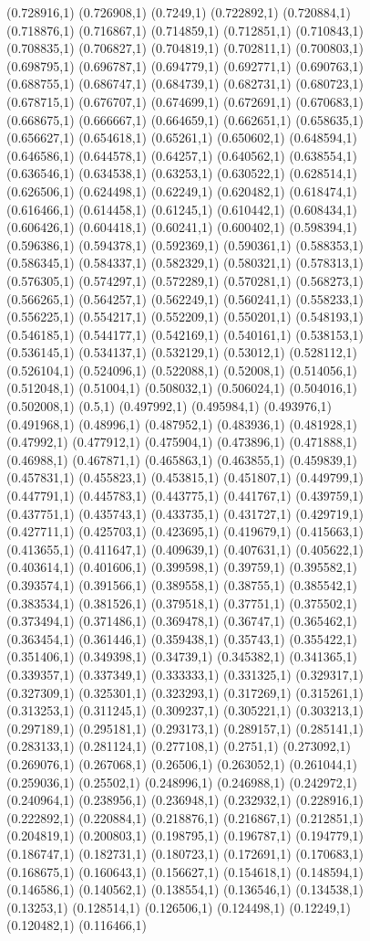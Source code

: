 \documentclass[conference]{IEEEtran}
\begin{document}
\begin{figure}[t]
(0.728916,1) (0.726908,1) (0.7249,1) (0.722892,1) (0.720884,1) (0.718876,1) (0.716867,1) (0.714859,1) (0.712851,1) (0.710843,1) (0.708835,1) (0.706827,1) (0.704819,1) (0.702811,1) (0.700803,1) (0.698795,1) (0.696787,1) (0.694779,1) (0.692771,1) (0.690763,1) (0.688755,1) (0.686747,1) (0.684739,1) (0.682731,1) (0.680723,1) (0.678715,1) (0.676707,1) (0.674699,1) (0.672691,1) (0.670683,1) (0.668675,1) (0.666667,1) (0.664659,1) (0.662651,1) (0.658635,1) (0.656627,1) (0.654618,1) (0.65261,1) (0.650602,1) (0.648594,1) (0.646586,1) (0.644578,1) (0.64257,1) (0.640562,1) (0.638554,1) (0.636546,1) (0.634538,1) (0.63253,1) (0.630522,1) (0.628514,1) (0.626506,1) (0.624498,1) (0.62249,1) (0.620482,1) (0.618474,1) (0.616466,1) (0.614458,1) (0.61245,1) (0.610442,1) (0.608434,1) (0.606426,1) (0.604418,1) (0.60241,1) (0.600402,1) (0.598394,1) (0.596386,1) (0.594378,1) (0.592369,1) (0.590361,1) (0.588353,1) (0.586345,1) (0.584337,1) (0.582329,1) (0.580321,1) (0.578313,1) (0.576305,1) (0.574297,1) (0.572289,1) (0.570281,1) (0.568273,1) (0.566265,1) (0.564257,1) (0.562249,1) (0.560241,1) (0.558233,1) (0.556225,1) (0.554217,1) (0.552209,1) (0.550201,1) (0.548193,1) (0.546185,1) (0.544177,1) (0.542169,1) (0.540161,1) (0.538153,1) (0.536145,1) (0.534137,1) (0.532129,1) (0.53012,1) (0.528112,1) (0.526104,1) (0.524096,1) (0.522088,1) (0.52008,1) (0.514056,1) (0.512048,1) (0.51004,1) (0.508032,1) (0.506024,1) (0.504016,1) (0.502008,1) (0.5,1) (0.497992,1) (0.495984,1) (0.493976,1) (0.491968,1) (0.48996,1) (0.487952,1) (0.483936,1) (0.481928,1) (0.47992,1) (0.477912,1) (0.475904,1) (0.473896,1) (0.471888,1) (0.46988,1) (0.467871,1) (0.465863,1) (0.463855,1) (0.459839,1) (0.457831,1) (0.455823,1) (0.453815,1) (0.451807,1) (0.449799,1) (0.447791,1) (0.445783,1) (0.443775,1) (0.441767,1) (0.439759,1) (0.437751,1) (0.435743,1) (0.433735,1) (0.431727,1) (0.429719,1) (0.427711,1) (0.425703,1) (0.423695,1) (0.419679,1) (0.415663,1) (0.413655,1) (0.411647,1) (0.409639,1) (0.407631,1) (0.405622,1) (0.403614,1) (0.401606,1) (0.399598,1) (0.39759,1) (0.395582,1) (0.393574,1) (0.391566,1) (0.389558,1) (0.38755,1) (0.385542,1) (0.383534,1) (0.381526,1) (0.379518,1) (0.37751,1) (0.375502,1) (0.373494,1) (0.371486,1) (0.369478,1) (0.36747,1) (0.365462,1) (0.363454,1) (0.361446,1) (0.359438,1) (0.35743,1) (0.355422,1) (0.351406,1) (0.349398,1) (0.34739,1) (0.345382,1) (0.341365,1) (0.339357,1) (0.337349,1) (0.333333,1) (0.331325,1) (0.329317,1) (0.327309,1) (0.325301,1) (0.323293,1) (0.317269,1) (0.315261,1) (0.313253,1) (0.311245,1) (0.309237,1) (0.305221,1) (0.303213,1) (0.297189,1) (0.295181,1) (0.293173,1) (0.289157,1) (0.285141,1) (0.283133,1) (0.281124,1) (0.277108,1) (0.2751,1) (0.273092,1) (0.269076,1) (0.267068,1) (0.26506,1) (0.263052,1) (0.261044,1) (0.259036,1) (0.25502,1) (0.248996,1) (0.246988,1) (0.242972,1) (0.240964,1) (0.238956,1) (0.236948,1) (0.232932,1) (0.228916,1) (0.222892,1) (0.220884,1) (0.218876,1) (0.216867,1) (0.212851,1) (0.204819,1) (0.200803,1) (0.198795,1) (0.196787,1) (0.194779,1) (0.186747,1) (0.182731,1) (0.180723,1) (0.172691,1) (0.170683,1) (0.168675,1) (0.160643,1) (0.156627,1) (0.154618,1) (0.148594,1) (0.146586,1) (0.140562,1) (0.138554,1) (0.136546,1) (0.134538,1) (0.13253,1) (0.128514,1) (0.126506,1) (0.124498,1) (0.12249,1) (0.120482,1) (0.116466,1) 
\end{figure}
\end{document}
